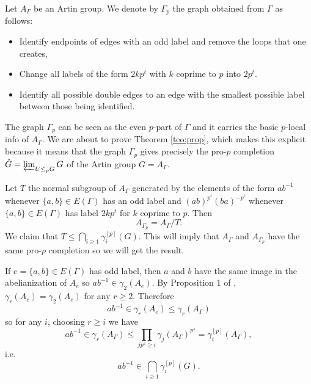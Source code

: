 \documentclass[10pt, oneside]{amsart}
\newcommand{\Z}{\mathbb{Z}} %
\newcommand{\F}{\mathbb{F}}
\newcommand{\gr}{\operatorname{gr}} %
\newtheorem{proposition}[theorem]{Proposition}
\theoremstyle{definition}
\theoremstyle{remark}
\theoremstyle{plain}
\begin{document}
Let $A_\Gamma$ be an Artin group. We denote by $\Gamma_p$ the graph obtained from $\Gamma$ as follows:

\begin{itemize}
    \item[(1)] Identify endpoints of edges with an odd label and remove the loops that one creates,
    
\item[(2)] Change all labels of the form $2kp^t$ with $k$ coprime to $p$ into $2p^t$.

\item[(3)] Identify all possible double edges to an edge with the smallest possible label between those being identified.
\end{itemize}



The graph $\Gamma_p$ can be seen as the even $p$-part of $\Gamma$ and it carries the basic $p$-local info of $A_\Gamma$. We are about to prove Theorem \ref{teo:prop}, which makes this explicit because it means that the graph $\Gamma_p$ gives precisely the pro-$p$ completion $\hat{G}=\varprojlim_{U\leq_pG}G$ of the Artin group $G=A_\Gamma$. 

 \bigskip

 Let $T$ the normal subgroup of $A_\Gamma$ generated by the elements of the form $ab^{-1}$ whenever $\{a,b\}\in E(\Gamma)$ has an odd label and $(ab)^{p^t}(ba)^{-p^t}$ whenever $\{a,b\}\in E(\Gamma)$ has label $2kp^t$ for $k$ coprime to $p$. Then 
$$A_{\Gamma_p}=A_\Gamma/T.$$
We claim that $T\leq \bigcap_{i\geq 1}\gamma_i^{[p]}(G)$. This will imply that $A_\Gamma$ and $A_{\Gamma_p}$ have the same pro-$p$ completion so we will get the result.

If $e=\{a,b\}\in E(\Gamma)$ has odd label, then $a$ and $b$ have the same image in the abelianization of $A_e$ so $ab^{-1}\in\gamma_2(A_e)$.
 By Proposition 1 of \cite{BGG}, $\gamma_r(A_e)=\gamma_2(A_e)$ for any $r\geq 2$. Therefore 
$$ab^{-1}\in\gamma_r(A_e)\leq\gamma_r(A_\Gamma)$$  
so for any $i$, choosing $r\geq i$ we have
$$ab^{-1}\in\gamma_r(A_\Gamma)\leq\prod_{jp^s\geq i}\gamma_j(A_\Gamma)^{p^s}=\gamma_i^{[p]}(A_\Gamma),$$  
i.e.
$$ab^{-1}\in  \bigcap_{i\geq 1}\gamma_i^{[p]}(G).$$  
\end{document}
